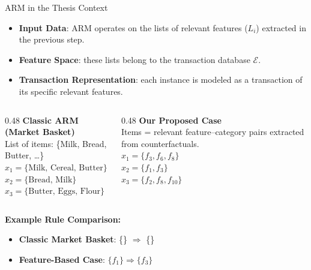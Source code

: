 \documentclass[10pt,aspectratio=169]{beamer}
\begin{document}
\begin{frame}{ARM in the Thesis Context}
  \begin{itemize}\small
    \item \textbf{Input Data}: ARM operates on the lists of relevant features ($L_i$) extracted in the previous step.
    \item \textbf{Feature Space}: these lists belong to the transaction database $\mathcal{E}$.
    \item \textbf{Transaction Representation}: each instance is modeled as a transaction of its specific relevant features.
  \end{itemize}
  \vspace{4pt}
  
  \begin{tcolorbox}[colback=parthenopeaccent!20,colframe=parthenopenavy,boxrule=0.5pt,arc=1pt]
    \begin{columns}[T,onlytextwidth]
      \begin{column}{0.48\textwidth}
        \textbf{Classic ARM (Market Basket)}\\[2pt]
        \footnotesize
        List of items: \{Milk, Bread, Butter, \ldots\}\\[4pt]
        $x_1 = \{ \text{Milk, Cereal, Butter} \}$\\
        $x_2 = \{ \text{Bread, Milk} \}$\\
        $x_3 = \{ \text{Butter, Eggs, Flour} \}$
      \end{column}
      \begin{column}{0.48\textwidth}
        \textbf{Our Proposed Case}\\[2pt]
        \footnotesize
        Items = relevant feature--category pairs extracted from counterfactuals.\\[4pt]
        $x_1 = \{ f_3, f_6, f_8 \}$\\
        $x_2 = \{ f_1, f_3 \}$\\
        $x_3 = \{ f_2, f_8, f_{10} \}$
      \end{column}
    \end{columns}
  \end{tcolorbox}
  
  \vspace{4pt}
  \textbf{Example Rule Comparison:}
  \begin{itemize}\small
    \item \textbf{Classic Market Basket}: \{\} $\Rightarrow$ \{\}
    \item \textbf{Feature-Based Case}: $\{f_1\} \Rightarrow \{f_3\}$
  \end{itemize}
\end{frame}
\end{document}
